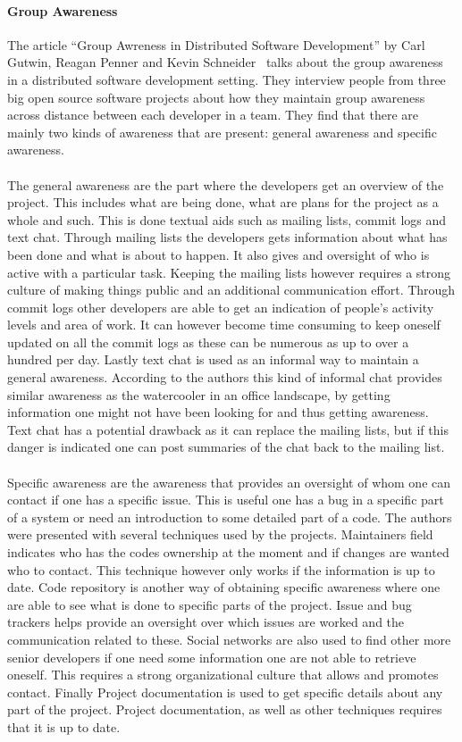 \documentclass[12pt]{article}
\begin{document}
\paragraph{Group Awareness}
The article ``Group Awreness in Distributed Software Development'' by Carl Gutwin, Reagan Penner and Kevin Schneider~\cite{Gutwin} talks about the group awareness in a distributed software development setting. They interview people from three big open source software projects about how they maintain group awareness across distance between each developer in a team. They find that there are mainly two kinds of awareness that are present: general awareness and specific awareness.
\\\\
The general awareness are the part where the developers get an overview of the project. This includes what are being done, what are plans for the project as a whole and such. This is done textual aids such as mailing lists, commit logs and text chat. Through mailing lists the developers gets information about what has been done and what is about to happen. It also gives and oversight of who is active with a particular task. Keeping the mailing lists however requires a strong culture of making things public and an additional communication effort. Through commit logs other developers are able to get an indication of people's activity levels and area of work. It can however become time consuming to keep oneself updated on all the commit logs as these can be numerous as up to over a hundred per day. Lastly text chat is used as an informal way to maintain a general awareness. According to the authors this kind of informal chat provides similar awareness as the watercooler in an office landscape, by getting information one might not have been looking for and thus getting awareness. Text chat has a potential drawback as it can replace the mailing lists, but if this danger is indicated one can post summaries of the chat back to the mailing list. 
\\\\
Specific awareness are the awareness that provides an oversight of whom one can contact if one has a specific issue. This is useful one has a bug in a specific part of a system or need an introduction to some detailed part of a code. The authors were presented with several techniques used by the projects. Maintainers field indicates who has the codes ownership at the moment and if changes are wanted who to contact. This technique however only works if the information is up to date. Code repository is another way of obtaining specific awareness where one are able to see what is done to specific parts of the project. Issue and bug trackers helps provide an oversight over which issues are worked and the communication related to these. Social networks are also used to find other more senior developers if one need some information one are not able to retrieve oneself. This requires a strong organizational culture that allows and promotes contact. Finally Project documentation is used to get specific details about any part of the project. Project documentation, as well as other techniques requires that it is up to date. 
\end{document}
